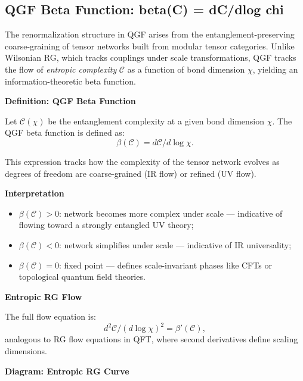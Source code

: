 \documentclass[11pt]{article}
\def\frac#1#2{#1/#2}
\def\texorpdfstring#1#2{#2}
\begin{document}
\subsection{\texorpdfstring{QGF Beta Function: \( \beta(\mathcal{C}) = \frac{d\mathcal{C}}{d\log \chi} \)}{QGF Beta Function: beta(C) = dC/dlog chi}}


The renormalization structure in QGF arises from the entanglement-preserving coarse-graining of tensor networks built from modular tensor categories. Unlike Wilsonian RG, which tracks couplings under scale transformations, QGF tracks the flow of \textit{entropic complexity} \( \mathcal{C} \) as a function of bond dimension \( \chi \), yielding an information-theoretic beta function.

\vspace{0.5em}
\noindent\textbf{Definition: QGF Beta Function}

Let \( \mathcal{C}(\chi) \) be the entanglement complexity at a given bond dimension \( \chi \). The QGF beta function is defined as:
\[
\beta(\mathcal{C}) = \frac{d\mathcal{C}}{d\log \chi}.
\]

This expression tracks how the complexity of the tensor network evolves as degrees of freedom are coarse-grained (IR flow) or refined (UV flow).

\vspace{0.5em}
\noindent\textbf{Interpretation}

\begin{itemize}
  \item \( \beta(\mathcal{C}) > 0 \): network becomes more complex under scale — indicative of flowing toward a strongly entangled UV theory;
  \item \( \beta(\mathcal{C}) < 0 \): network simplifies under scale — indicative of IR universality;
  \item \( \beta(\mathcal{C}) = 0 \): fixed point — defines scale-invariant phases like CFTs or topological quantum field theories.
\end{itemize}

\vspace{0.5em}
\noindent\textbf{Entropic RG Flow}

The full flow equation is:
\[
\frac{d^2 \mathcal{C}}{(d\log \chi)^2} = \beta'(\mathcal{C}),
\]
analogous to RG flow equations in QFT, where second derivatives define scaling dimensions.

\vspace{0.5em}
\noindent\textbf{Diagram: Entropic RG Curve}
\end{document}
